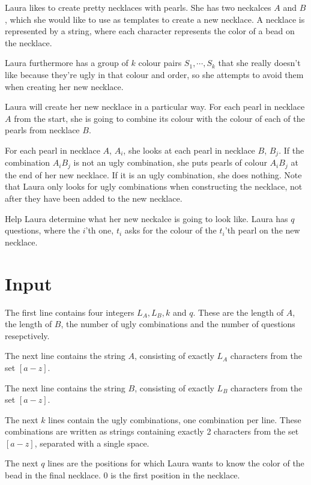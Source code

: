 \noindent
Laura likes to create pretty necklaces with pearls. 
She has two neckalces $A$ and $B$, which she would like to use as templates to create a new necklace.
A necklace is represented by a string, where each character represents the color of a bead on the necklace.

Laura furthermore has a group of $k$ colour pairs $S_1, \cdots, S_k$ 
that she really doesn't like because they're ugly in that colour and order, 
so she attempts to avoid them when creating her new necklace.

Laura will create her new necklace in a particular way. 
For each pearl in necklace $A$ from the start, 
she is going to combine its colour with the colour of each of 
the pearls from necklace $B$.

For each pearl in necklace $A$, $A_i$, 
she looks at each pearl in necklace $B$, $B_j$.
If the combination $A_iB_j$ is not an ugly combination, she puts pearls of colour $A_iB_j$ at the end of her new necklace.
If it is an ugly combination, she does nothing. 
Note that Laura only looks for ugly combinations when constructing the necklace, not after they have been added to the new necklace.

Help Laura determine what her new neckalce is going to look like. Laura has $q$ questions, where the $i$'th one, $t_i$ asks for the colour of the $t_i$'th pearl on the new necklace.

\section*{Input}
The first line contains four integers $L_A, L_B, k$ and $q$. 
These are the length of $A$, the length of $B$, the number of ugly combinations and the number of questions resepctively.

The next line contains the string $A$, consisting of exactly $L_A$ characters from the set $[a-z]$.

The next line contains the string $B$, consisting of exactly $L_B$ characters from the set $[a-z]$.

The next $k$ lines contain the ugly combinations, one combination per line. 
These combinations are written as strings containing exactly 2 characters from the set $[a-z]$, separated with a single space.

The next $q$ lines are the positions for which Laura wants to know the color of the bead in the final necklace. 
0 is the first position in the necklace.

